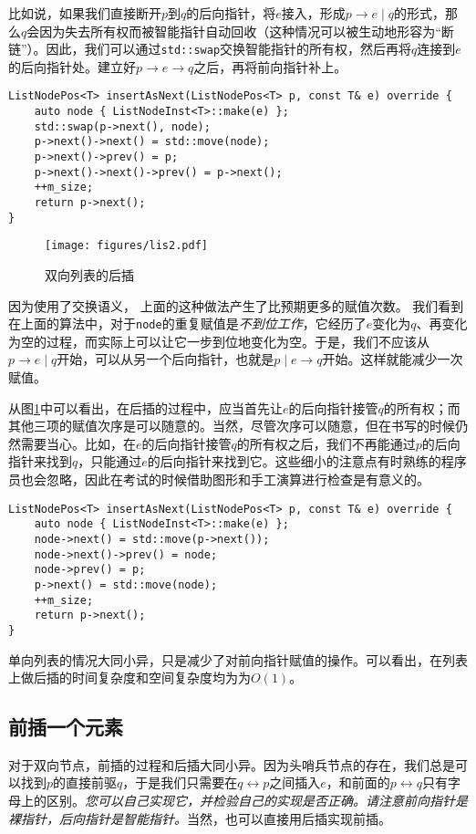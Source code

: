 比如说，如果我们直接断开$p$到$q$的后向指针，将$e$接入，形成$p\rightarrow e\mid q$的形式，那么$q$会因为失去所有权而被智能指针自动回收（这种情况可以被生动地形容为“断链”）。因此，我们可以通过\lstinline{std::swap}交换智能指针的所有权，然后再将$q$连接到$e$的后向指针处。建立好$p\rightarrow e\rightarrow q$之后，再将前向指针补上。

\begin{lstlisting}
ListNodePos<T> insertAsNext(ListNodePos<T> p, const T& e) override {
    auto node { ListNodeInst<T>::make(e) };
    std::swap(p->next(), node);
    p->next()->next() = std::move(node);
    p->next()->prev() = p;
    p->next()->next()->prev() = p->next();
    ++m_size;
    return p->next();
}
\end{lstlisting}

\begin{figure}
  \centering
  \texttt{[image: figures/lis2.pdf]}
  \caption{双向列表的后插}
  \label{fig:lis2}
\end{figure}

因为使用了交换语义，
上面的这种做法产生了比预期更多的赋值次数。
我们看到在上面的算法中，对于\lstinline{node}的重复赋值是\textit{不到位工作}，它经历了$e$变化为$ q$、再变化为空的过程，而实际上可以让它一步到位地变化为空。于是，我们不应该从$p\rightarrow e\mid q$开始，可以从另一个后向指针，也就是$p\mid e\rightarrow q$开始。这样就能减少一次赋值。

从图\ref{fig:lis2}中可以看出，在后插的过程中，应当首先让$e$的后向指针接管$q$的所有权；而其他三项的赋值次序是可以随意的。当然，尽管次序可以随意，但在书写的时候仍然需要当心。比如，在$e$的后向指针接管$q$的所有权之后，我们不再能通过$p$的后向指针来找到$q$，只能通过$e$的后向指针来找到它。这些细小的注意点有时熟练的程序员也会忽略，因此在考试的时候借助图形和手工演算进行检查是有意义的。

\begin{lstlisting}
ListNodePos<T> insertAsNext(ListNodePos<T> p, const T& e) override {
    auto node { ListNodeInst<T>::make(e) };
    node->next() = std::move(p->next());
    node->next()->prev() = node;
    node->prev() = p;
    p->next() = std::move(node);
    ++m_size;
    return p->next();
}
\end{lstlisting}



单向列表的情况大同小异，只是减少了对前向指针赋值的操作。可以看出，在列表上做后插的时间复杂度和空间复杂度均为为$O(1)$。

\subsection{前插一个元素}
\label{sec:前插一个元素}
对于双向节点，前插的过程和后插大同小异。因为头哨兵节点的存在，我们总是可以找到$p$的直接前驱$q$，于是我们只需要在$q\leftrightarrow p$之间插入$e$，和前面的$p\leftrightarrow q$只有字母上的区别。\textit{您可以自己实现它，并检验自己的实现是否正确。请注意前向指针是裸指针，后向指针是智能指针。}当然，也可以直接用后插实现前插。

